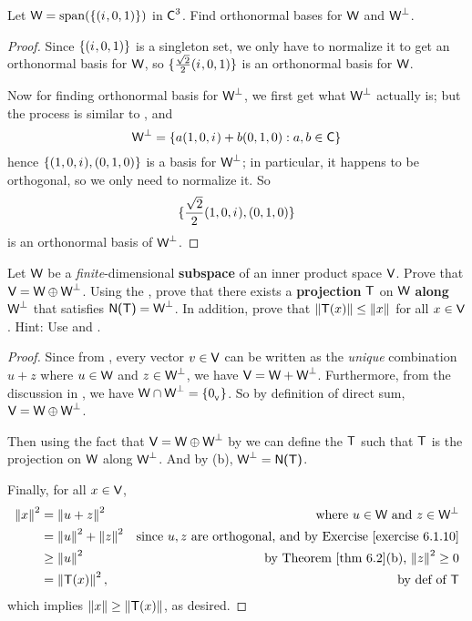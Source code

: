 \begin{exercise} \label{exercise 6.2.9}
Let \(\textsf{W} = \operatorname{span}(\{ ({i\mkern1mu}, 0, 1) \})\) in \(\textsf{C}^3\).
Find orthonormal bases for \(\textsf{W}\) and \(\textsf{W}^{\perp}\).
\end{exercise}

\begin{proof}
Since \(\{({i\mkern1mu}, 0, 1)\}\) is a singleton set, we only have to normalize it to get an orthonormal basis for \(\textsf{W}\), so \(\{ \frac{\sqrt{2}}{2} ({i\mkern1mu}, 0, 1) \}\) is an orthonormal basis for \(\textsf{W}\).

Now for finding orthonormal basis for \(\textsf{W}^{\perp}\), we first get what \(\textsf{W}^{\perp}\) actually is; but the process is similar to , and
\[
    \textsf{W}^{\perp} = \{ a(1, 0, {i\mkern1mu}) + b(0, 1, 0) : a, b \in \textsf{C} \}
\]
hence \(\{ (1, 0, {i\mkern1mu}), (0, 1, 0) \}\) is a basis for \(\textsf{W}^{\perp}\);
in particular, it happens to be orthogonal, so we only need to normalize it.
So
\[
    \{ \frac{\sqrt{2}}{2} (1, 0, {i\mkern1mu}), (0, 1, 0) \}
\]
is an orthonormal basis of \(\textsf{W}^{\perp}\).
\end{proof}

\begin{exercise} \label{exercise 6.2.10}
Let \(\textsf{W}\) be a \emph{finite}-dimensional \textbf{subspace} of an inner product space \(\textsf{V}\).
Prove that \(\textsf{V} = \textsf{W} \oplus \textsf{W}^{\perp}\).
Using the , prove that there exists a \textbf{projection} \(\textsf{T}\) on \(\textsf{W}\) \textbf{along} \(\textsf{W}^{\perp}\) that satisfies \(\textsf{N(T)} = \textsf{W}^{\perp}\).
In addition, prove that \(\left\lVert\textsf{T}(x)\right\rVert \le \left\lVert x\right\rVert\) for all \(x \in \textsf{V}\).
Hint: Use  and .
\end{exercise}

\begin{proof}
Since from , every vector \(v \in \textsf{V}\) can be written as the \emph{unique} combination \(u + z\) where \(u \in \textsf{W}\) and \(z \in \textsf{W}^{\perp}\), we have \(\textsf{V} = \textsf{W} + \textsf{W}^{\perp}\).
Furthermore, from the discussion in , we have \(\textsf{W} \cap \textsf{W}^{\perp} = \{ 0_{_{\textsf{V}}} \}\).
So by definition of direct sum, \(\textsf{V} = \textsf{W} \oplus \textsf{W}^{\perp}\).

Then using the fact that \(\textsf{V} = \textsf{W} \oplus \textsf{W}^{\perp}\) by  we can define the \(\textsf{T}\) such that \(\textsf{T}\) is the projection on \(\textsf{W}\) along \(\textsf{W}^{\perp}\).
And by (b), \(\textsf{W}^{\perp} = \textsf{N(T)}\).

Finally, for all \(x \in \textsf{V}\),
\begin{align*}
    \norm{x}^2 & = \norm{u + z}^2 & \text{where \(u \in \W\) and \(z \in \W^{\perp}\)} \\
        & = \norm{u}^2 + \norm{z}^2 & \text{since \(u, z\) are orthogonal, and by \EXEC{6.1.10}} \\
        & \ge \norm{u}^2 & \text{by \THM{6.2}(b), \(\norm{z}^2 \ge 0\)} \\
        & = \norm{\T(x)}^2, & \text{by def of \(\T\)}
\end{align*}
which implies \(\left\lVert x\right\rVert \ge \left\lVert\textsf{T}(x)\right\rVert\), as desired.
\end{proof}

